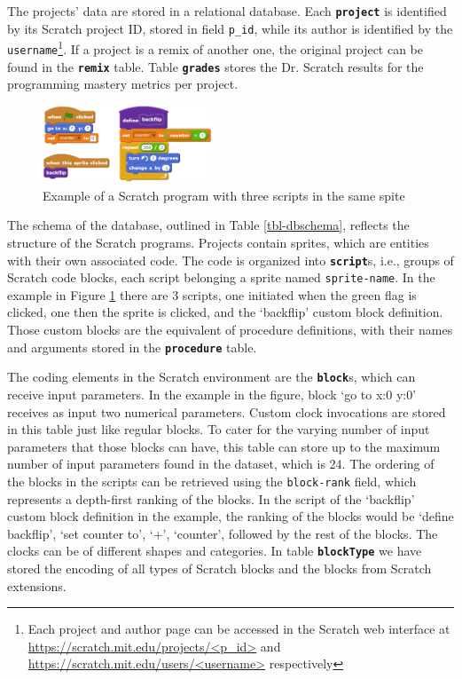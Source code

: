 \documentclass[10pt, conference]{IEEEtran}
\begin{document}
The projects' data are stored in a relational database. Each \textbf{\texttt{project}} is identified by its Scratch project ID, stored in field \texttt{p\_id}, while its author is identified by the \texttt{username}\footnote{\label{fn-authorpage}Each project and author page can be accessed in the Scratch web interface at \url{https://scratch.mit.edu/projects/<p_id>} and \url{https://scratch.mit.edu/users/<username>} respectively}.
If a project is a remix of another one, the original project can be found in the \textbf{\texttt{remix}} table.
Table \textbf{\texttt{grades}} stores the Dr. Scratch results for the programming mastery metrics per project.
 
 \begin{figure}
 	\centering
 	\includegraphics[width=0.45\textwidth]{scratchExample}
 	\caption{Example of a Scratch program with three scripts in the same spite}
 	\label{fig-scratchExample}
 \end{figure}

The schema of the database, outlined in Table \ref{tbl-dbschema}, reflects the structure of the Scratch programs.
Projects contain sprites, which are entities with their own associated code.
The code is organized into \textbf{\texttt{script}}s, i.e., groups of Scratch code blocks, each script belonging a sprite named \texttt{sprite-name}.
In the example in Figure \ref{fig-scratchExample} there are 3 scripts, one initiated when the green flag is clicked, one then the sprite is clicked, and the `backflip' custom block definition.
Those custom blocks are the equivalent of procedure definitions, with their names and arguments stored in the \textbf{\texttt{procedure}} table.

The coding elements in the Scratch environment are the \textbf{\texttt{block}}s, which can receive input parameters.
In the example in the figure, block `go to x:0 y:0' receives as input two numerical parameters.
Custom clock invocations are stored in this table just like regular blocks.
To cater for the varying number of input parameters that those blocks can have, this table can store up to the maximum number of input parameters found in the dataset, which is 24.
The ordering of the blocks in the scripts can be retrieved using the \texttt{block-rank} field, which represents a depth-first ranking of the blocks.
In the script of the `backflip' custom block definition in the example, the ranking of the blocks would be `define backflip', `set counter to', `+', `counter', followed by the rest of the blocks.
The clocks can be of different shapes and categories.
In table \textbf{\texttt{blockType}} we have stored the encoding of all types of Scratch blocks and the blocks from Scratch extensions.
\end{document}
